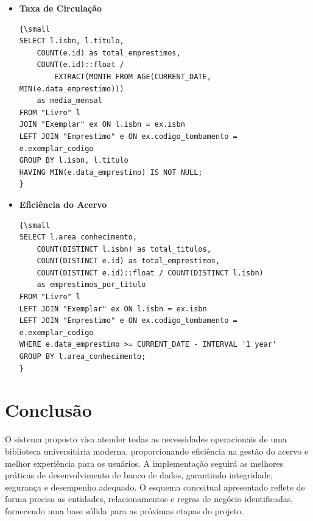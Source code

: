 \documentclass[12pt,a4paper]{article}
\begin{document}
\begin{tcolorbox}[title=Métricas do Sistema]
\begin{itemize}
    \item \textbf{Taxa de Circulação}
    \begin{verbatim}
{\small
SELECT l.isbn, l.titulo,
    COUNT(e.id) as total_emprestimos,
    COUNT(e.id)::float /
        EXTRACT(MONTH FROM AGE(CURRENT_DATE, MIN(e.data_emprestimo)))
    as media_mensal
FROM "Livro" l
JOIN "Exemplar" ex ON l.isbn = ex.isbn
LEFT JOIN "Emprestimo" e ON ex.codigo_tombamento = e.exemplar_codigo
GROUP BY l.isbn, l.titulo
HAVING MIN(e.data_emprestimo) IS NOT NULL;
}
    \end{verbatim}

    \item \textbf{Eficiência do Acervo}
    \begin{verbatim}
{\small
SELECT l.area_conhecimento,
    COUNT(DISTINCT l.isbn) as total_titulos,
    COUNT(DISTINCT e.id) as total_emprestimos,
    COUNT(DISTINCT e.id)::float / COUNT(DISTINCT l.isbn)
    as emprestimos_por_titulo
FROM "Livro" l
LEFT JOIN "Exemplar" ex ON l.isbn = ex.isbn
LEFT JOIN "Emprestimo" e ON ex.codigo_tombamento = e.exemplar_codigo
WHERE e.data_emprestimo >= CURRENT_DATE - INTERVAL '1 year'
GROUP BY l.area_conhecimento;
}
    \end{verbatim}
\end{itemize}
\end{tcolorbox}




\section{Conclusão}

O sistema proposto visa atender todas as necessidades operacionais de uma biblioteca universitária moderna, proporcionando eficiência na gestão do acervo e melhor experiência para os usuários. A implementação seguirá as melhores práticas de desenvolvimento de banco de dados, garantindo integridade, segurança e desempenho adequado. O esquema conceitual apresentado reflete de forma precisa as entidades, relacionamentos e regras de negócio identificadas, fornecendo uma base sólida para as próximas etapas do projeto.
\end{document}
